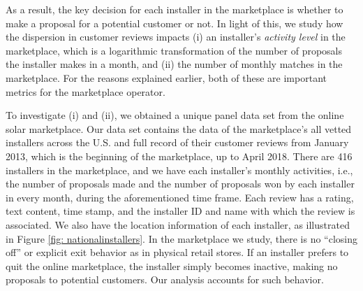 \documentclass[msom,blindrev]{informs3}
\begin{document}
%	
%	
	
	As a result, the key decision for each installer in the marketplace is whether to make a proposal for a potential customer or not. In light of this, we study how the dispersion in customer reviews impacts (i) an installer's \emph{activity level} in the marketplace, which is a logarithmic transformation of the number of proposals the installer makes in a month, and (ii) the number of monthly matches in the marketplace. For the reasons explained earlier, both of these are important metrics for the marketplace operator.
	
	
	
	To investigate (i) and (ii), we obtained a unique panel data set from the online solar marketplace. Our data set contains the data of the marketplace's all vetted installers across the U.S. and full record of their customer reviews from January 2013, which is the beginning of the marketplace, up to April 2018. There are 416 installers in the marketplace, and we have each installer's monthly activities, i.e., the number of proposals made and the number of proposals won by each installer in every month, during the aforementioned time frame. Each review has a rating, text content, time stamp, and the installer ID and name with which the review is associated. We also have the location information of each installer, as illustrated in Figure \ref{fig: nationalinstallers}. In the marketplace we study, there is no ``closing off'' or explicit exit behavior as in physical retail stores. If an installer prefers to quit the online marketplace, the installer simply becomes inactive, making no proposals to potential customers. Our analysis accounts for such behavior.
	
	
	
	
\end{document}
